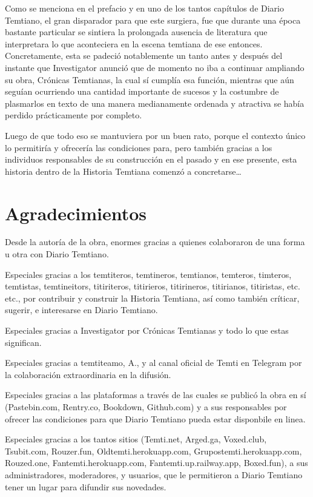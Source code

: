 \documentclass[
]{book}
\begin{document}
Como se menciona en el prefacio y en uno de los tantos capítulos de Diario Temtiano, el gran disparador para que este surgiera, fue que durante una época bastante particular se sintiera la prolongada ausencia de literatura que interpretara lo que aconteciera en la escena temtiana de ese entonces. Concretamente, esta se padeció notablemente un tanto antes y después del instante que Investigator anunció que de momento no iba a continuar ampliando su obra, Crónicas Temtianas, la cual sí cumplía esa función, mientras que aún seguían ocurriendo una cantidad importante de sucesos y la costumbre de plasmarlos en texto de una manera medianamente ordenada y atractiva se había perdido prácticamente por completo.

Luego de que todo eso se mantuviera por un buen rato, porque el contexto único lo permitiría y ofrecería las condiciones para, pero también gracias a los individuos responsables de su construcción en el pasado y en ese presente, esta historia dentro de la Historia Temtiana comenzó a concretarse\ldots{}

\hypertarget{agradecimientos}{%
\section*{Agradecimientos}\label{agradecimientos}}

Desde la autoría de la obra, enormes gracias a quienes colaboraron de una forma u otra con Diario Temtiano.

Especiales gracias a los temtiteros, temtineros, temtianos, temteros, timteros, temtistas, temtineitors, titiriteros, titirieros, titirineros, titirianos, titiristas, etc. etc., por contribuir y construir la Historia Temtiana, así como también críticar, sugerir, e interesarse en Diario Temtiano.

Especiales gracias a Investigator por Crónicas Temtianas y todo lo que estas significan.

Especiales gracias a temtiteamo, A., y al canal oficial de Temti en Telegram por la colaboración extraordinaria en la difusión.

Especiales gracias a las plataformas a través de las cuales se publicó la obra en sí (Pastebin.com, Rentry.co, Bookdown, Github.com) y a sus responsables por ofrecer las condiciones para que Diario Temtiano pueda estar disponbile en linea.

Especiales gracias a los tantos sitios (Temti.net, Arged.ga, Voxed.club, Tsubit.com, Rouzer.fun, Oldtemti.herokuapp.com, Grupostemti.herokuapp.com, Rouzed.one, Fantemti.herokuapp.com, Fantemti.up.railway.app, Boxed.fun), a sus administradores, moderadores, y usuarios, que le permitieron a Diario Temtiano tener un lugar para difundir sus novedades.
\end{document}
